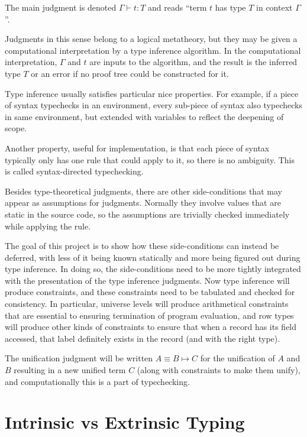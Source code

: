 \documentclass[11pt, twoside, reqno]{book}
\begin{document}
The main judgment is denoted \(\Gamma \vdash t : T\) and reads ``term \(t\) has type \(T\) in context \(\Gamma\)''.

Judgments in this sense belong to a logical metatheory, but they may be given a computational interpretation by a type inference algorithm.
In the computational interpretation, \(\Gamma\) and \(t\) are inputs to the algorithm, and the result is the inferred type \(T\) or an error if no proof tree could be constructed for it.

Type inference usually satisfies particular nice properties.
For example, if a piece of syntax typechecks in an environment, every sub-piece of syntax also typechecks in same environment, but extended with variables to reflect the deepening of scope.

Another property, useful for implementation, is that each piece of syntax typically only has one rule that could apply to it, so there is no ambiguity.
This is called syntax-directed typechecking.

Besides type-theoretical judgments, there are other side-conditions that may appear as assumptions for judgments.
Normally they involve values that are static in the source code, so the assumptions are trivially checked immediately while applying the rule.

The goal of this project is to show how these side-conditions can instead be deferred, with less of it being known statically and more being figured out during type inference.
In doing so, the side-conditions need to be more tightly integrated with the presentation of the type inference judgments.
Now type inference will produce constraints, and these constraints need to be tabulated and checked for consistency.
In particular, universe levels will produce arithmetical constraints that are essential to ensuring termination of program evaluation, and row types will produce other kinds of constraints to ensure that when a record has its field accessed, that label definitely exists in the record (and with the right type).

The unification judgment will be written \(A \equiv B \mapsto C\) for the unification of \(A\) and \(B\) resulting in a new unified term \(C\) (along with constraints to make them unify), and computationally this is a part of typechecking.


\section{Intrinsic vs Extrinsic Typing}
\end{document}
